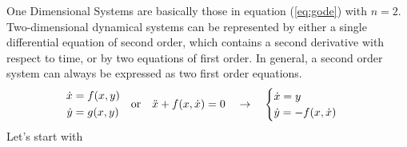 One Dimensional Systems are basically those in equation (\ref{eq:gode}) with $n=2$.
Two-dimensional dynamical systems can be represented by either a single differential equation of second order, which contains a second derivative with respect to time, or by two equations of first order.
In general, a second order system can always be expressed as two first order equations.
\begin{equation}{\label{eq:2d}}
	\begin{aligned}
		\dot{x}&=f(x,y)\\
		\dot{y}&=g(x,y)
	\end{aligned}\quad\text{or}\quad
	\ddot{x}+f(x,\dot{x})=0 \quad \rightarrow \quad 
	\begin{cases} 
		\dot{x}=y&\\
		\dot{y}=-f(x,\dot{x})&
	\end{cases}
\end{equation}
Let's start with